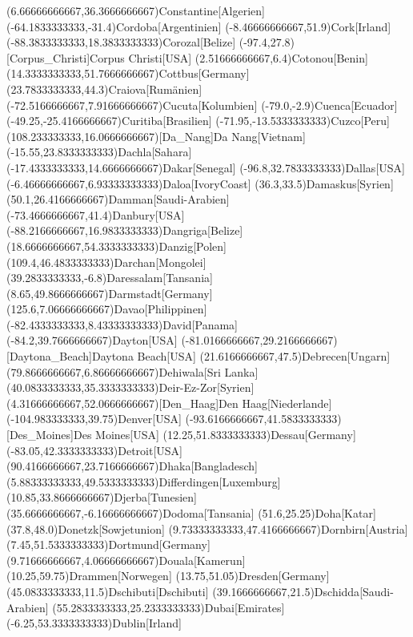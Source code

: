 \mapput(6.66666666667,36.3666666667){Constantine}[Algerien]
\mapput(-64.1833333333,-31.4){Cordoba}[Argentinien]
\mapput(-8.46666666667,51.9){Cork}[Irland]
\mapput(-88.3833333333,18.3833333333){Corozal}[Belize]
\mapput(-97.4,27.8)[Corpus_Christi]{Corpus Christi}[USA]
\mapput(2.51666666667,6.4){Cotonou}[Benin]
\mapput(14.3333333333,51.7666666667){Cottbus}[Germany]
\mapput(23.7833333333,44.3){Craiova}[Rumänien]
\mapput(-72.5166666667,7.91666666667){Cucuta}[Kolumbien]
\mapput(-79.0,-2.9){Cuenca}[Ecuador]
\mapput(-49.25,-25.4166666667){Curitiba}[Brasilien]
\mapput(-71.95,-13.5333333333){Cuzco}[Peru]
\mapput(108.233333333,16.0666666667)[Da_Nang]{Da Nang}[Vietnam]
\mapput(-15.55,23.8333333333){Dachla}[Sahara]
\mapput(-17.4333333333,14.6666666667){Dakar}[Senegal]
\mapput(-96.8,32.7833333333){Dallas}[USA]
\mapput(-6.46666666667,6.93333333333){Daloa}[IvoryCoast]
\mapput(36.3,33.5){Damaskus}[Syrien]
\mapput(50.1,26.4166666667){Damman}[Saudi-Arabien]
\mapput(-73.4666666667,41.4){Danbury}[USA]
\mapput(-88.2166666667,16.9833333333){Dangriga}[Belize]
\mapput(18.6666666667,54.3333333333){Danzig}[Polen]
\mapput(109.4,46.4833333333){Darchan}[Mongolei]
\mapput(39.2833333333,-6.8){Daressalam}[Tansania]
\mapput(8.65,49.8666666667){Darmstadt}[Germany]
\mapput(125.6,7.06666666667){Davao}[Philippinen]
\mapput(-82.4333333333,8.43333333333){David}[Panama]
\mapput(-84.2,39.7666666667){Dayton}[USA]
\mapput(-81.0166666667,29.2166666667)[Daytona_Beach]{Daytona Beach}[USA]
\mapput(21.6166666667,47.5){Debrecen}[Ungarn]
\mapput(79.8666666667,6.86666666667){Dehiwala}[Sri Lanka]
\mapput(40.0833333333,35.3333333333){Deir-Ez-Zor}[Syrien]
\mapput(4.31666666667,52.0666666667)[Den_Haag]{Den Haag}[Niederlande]
\mapput(-104.983333333,39.75){Denver}[USA]
\mapput(-93.6166666667,41.5833333333)[Des_Moines]{Des Moines}[USA]
\mapput(12.25,51.8333333333){Dessau}[Germany]
\mapput(-83.05,42.3333333333){Detroit}[USA]
\mapput(90.4166666667,23.7166666667){Dhaka}[Bangladesch]
\mapput(5.88333333333,49.5333333333){Differdingen}[Luxemburg]
\mapput(10.85,33.8666666667){Djerba}[Tunesien]
\mapput(35.6666666667,-6.16666666667){Dodoma}[Tansania]
\mapput(51.6,25.25){Doha}[Katar]
\mapput(37.8,48.0){Donetzk}[Sowjetunion]
\mapput(9.73333333333,47.4166666667){Dornbirn}[Austria]
\mapput(7.45,51.5333333333){Dortmund}[Germany]
\mapput(9.71666666667,4.06666666667){Douala}[Kamerun]
\mapput(10.25,59.75){Drammen}[Norwegen]
\mapput(13.75,51.05){Dresden}[Germany]
\mapput(45.0833333333,11.5){Dschibuti}[Dschibuti]
\mapput(39.1666666667,21.5){Dschidda}[Saudi-Arabien]
\mapput(55.2833333333,25.2333333333){Dubai}[Emirates]
\mapput(-6.25,53.3333333333){Dublin}[Irland]
